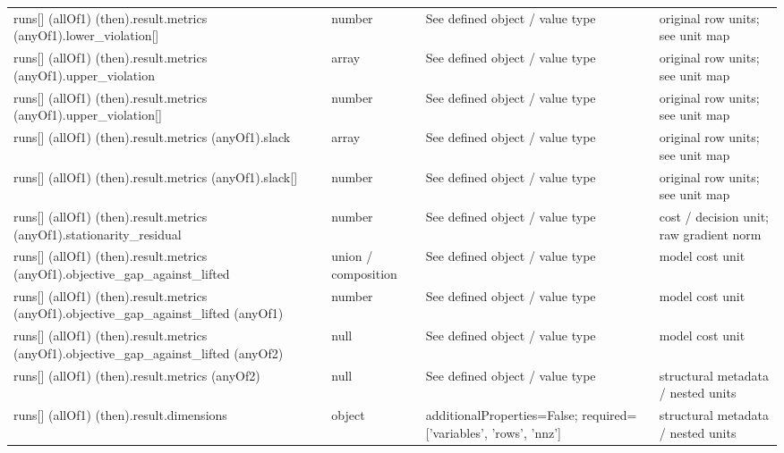 \begin{longtable}{@{}>{\raggedright\arraybackslash}p{}>{\raggedright\arraybackslash}p{}>{\raggedright\arraybackslash}p{}>{\raggedright\arraybackslash}p{}@{}}
runs[] (allOf1) (then).\allowbreak{}result.\allowbreak{}metrics (anyOf1).\allowbreak{}lower\_\allowbreak{}violation[] & number & See defined object /\allowbreak{} value type & original row units; see unit map\\
runs[] (allOf1) (then).\allowbreak{}result.\allowbreak{}metrics (anyOf1).\allowbreak{}upper\_\allowbreak{}violation & array & See defined object /\allowbreak{} value type & original row units; see unit map\\
runs[] (allOf1) (then).\allowbreak{}result.\allowbreak{}metrics (anyOf1).\allowbreak{}upper\_\allowbreak{}violation[] & number & See defined object /\allowbreak{} value type & original row units; see unit map\\
runs[] (allOf1) (then).\allowbreak{}result.\allowbreak{}metrics (anyOf1).\allowbreak{}slack & array & See defined object /\allowbreak{} value type & original row units; see unit map\\
runs[] (allOf1) (then).\allowbreak{}result.\allowbreak{}metrics (anyOf1).\allowbreak{}slack[] & number & See defined object /\allowbreak{} value type & original row units; see unit map\\
runs[] (allOf1) (then).\allowbreak{}result.\allowbreak{}metrics (anyOf1).\allowbreak{}stationarity\_\allowbreak{}residual & number & See defined object /\allowbreak{} value type & cost /\allowbreak{} decision unit; raw gradient norm\\
runs[] (allOf1) (then).\allowbreak{}result.\allowbreak{}metrics (anyOf1).\allowbreak{}objective\_\allowbreak{}gap\_\allowbreak{}against\_\allowbreak{}lifted & union /\allowbreak{} composition & See defined object /\allowbreak{} value type & model cost unit\\
runs[] (allOf1) (then).\allowbreak{}result.\allowbreak{}metrics (anyOf1).\allowbreak{}objective\_\allowbreak{}gap\_\allowbreak{}against\_\allowbreak{}lifted (anyOf1) & number & See defined object /\allowbreak{} value type & model cost unit\\
runs[] (allOf1) (then).\allowbreak{}result.\allowbreak{}metrics (anyOf1).\allowbreak{}objective\_\allowbreak{}gap\_\allowbreak{}against\_\allowbreak{}lifted (anyOf2) & null & See defined object /\allowbreak{} value type & model cost unit\\
runs[] (allOf1) (then).\allowbreak{}result.\allowbreak{}metrics (anyOf2) & null & See defined object /\allowbreak{} value type & structural metadata /\allowbreak{} nested units\\
runs[] (allOf1) (then).\allowbreak{}result.\allowbreak{}dimensions & object & additionalProperties=\allowbreak{}False; required=\allowbreak{}['variables', 'rows', 'nnz'] & structural metadata /\allowbreak{} nested units\\

\end{longtable}
